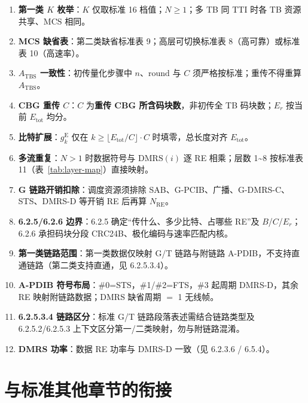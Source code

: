 \documentclass[11pt,a4paper]{ctexart}
\begin{document}
\begin{enumerate}[nosep]
  \item \textbf{第一类 $K$ 枚举}：$K$ 仅取标准 16 档值；$N \geq 1$；多 TB 同 TTI 时各 TB 资源共享、MCS 相同。
  \item \textbf{MCS 缺省表}：第二类缺省标准表 9；高层可切换标准表 8（高可靠）或标准表 10（高速率）。
  \item \textbf{$A_{\mathrm{TBS}}$ 一致性}：初传量化步骤中 $n$、$\mathrm{round}$ 与 $C$ 须严格按标准；重传不得重算 $A_{\mathrm{TBS}}$。
  \item \textbf{CBG 重传 $C$}：$C$ 为\textbf{重传 CBG 所含码块数}，非初传全 TB 码块数；$E_r$ 按当前 $E_{\mathrm{tot}}$ 均分。
  \item \textbf{比特扩展}：$g^{\mathrm{E}}_k$ 仅在 $k \geq \lfloor E_{\mathrm{tot}}/C \rfloor \cdot C$ 时填零，总长度对齐 $E_{\mathrm{tot}}$。
  \item \textbf{多流重复}：$N>1$ 时数据符号与 $\mathrm{DMRS}(i)$ 逐 RE 相乘；层数 1\textasciitilde 8 按标准表 11（表~\ref{tab:layer-map}）直接映射。
  \item \textbf{G 链路开销扣除}：调度资源须排除 SAB、G-PCIB、广播、G-DMRS-C、STS、DMRS-D 等开销 RE 后再算 $N_{\mathrm{RE}}$。
  \item \textbf{6.2.5/6.2.6 边界}：6.2.5 确定``传什么、多少比特、占哪些 RE''及 $B$/$C$/$E_r$；6.2.6 承担码块分段 CRC24B、极化编码与速率匹配内核。
  \item \textbf{第一类链路范围}：第一类数据仅映射 G/T 链路与附链路 A-PDIB，不支持直通链路（第二类支持直通，见 6.2.5.3.4）。
  \item \textbf{A-PDIB 符号布局}：\#0=STS，\#1/\#2=FTS，\#3 起周期 DMRS-D，其余 RE 映射附链路数据；DMRS 缺省周期 $=$ 1 无线帧。
  \item \textbf{6.2.5.3.4 链路区分}：标准 G/T 链路段落表述需结合链路类型及 6.2.5.2/6.2.5.3 上下文区分第一/二类映射，勿与附链路混淆。
  \item \textbf{DMRS 功率}：数据 RE 功率与 DMRS-D 一致（见 6.2.3.6 / 6.5.4）。
\end{enumerate}

\section{与标准其他章节的衔接}
\end{document}
